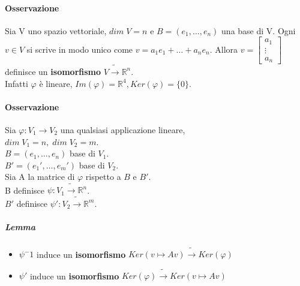 \documentclass[a4paper, 12pt]{report}
\begin{document}
        \paragraph{Osservazione} Sia V uno spazio vettoriale, $dim \; V=n$ e $B=(e_1,\dots,e_n)$ una base di V.
        Ogni $v \in V$ si scrive in modo unico come $v=a_1e_1+\dots+a_ne_n$.
        Allora $v=
        \begin{bmatrix}
            a_1\\
            \vdots\\
            a_n
        \end{bmatrix}
        $ definisce un \textbf{isomorfismo} $V \tilde{\rightarrow}\mathbb{R}^n$.\\
        Infatti $\varphi$ è lineare, $Im(\varphi)=\mathbb{R}^4, Ker(\varphi)=\{0\}$.
        \paragraph{Osservazione} Sia $\varphi:V_1 \rightarrow V_2$ una qualsiasi applicazione lineare,\\
        $dim \; V_1=n,\; dim \; V_2=m$.\\
        $B=(e_1,\dots,e_n)$ base di $V_1$.\\
        $B'=(e_1',\dots,e_m')$ base di $V_2$.\\
        Sia A la matrice di $\varphi$ rispetto a $B \text{ e } B'$.\\
        B definisce $\psi: V_1 \tilde{\rightarrow}\mathbb{R}^n$.\\
        $B'$ definisce $\psi': V_2 \tilde{\rightarrow}\mathbb{R}^m$.
        \subparagraph{Lemma}
        \begin{itemize}
            \item $\psi^-1$ induce un \textbf{isomorfismo} $Ker(v\mapsto Av)\tilde{\rightarrow}Ker(\varphi)$
            \item $\psi'$ induce un \textbf{isomorfismo} $Ker(\varphi)\tilde{\rightarrow}Ker(v\mapsto Av)$
        \end{itemize}
        
\end{document}
